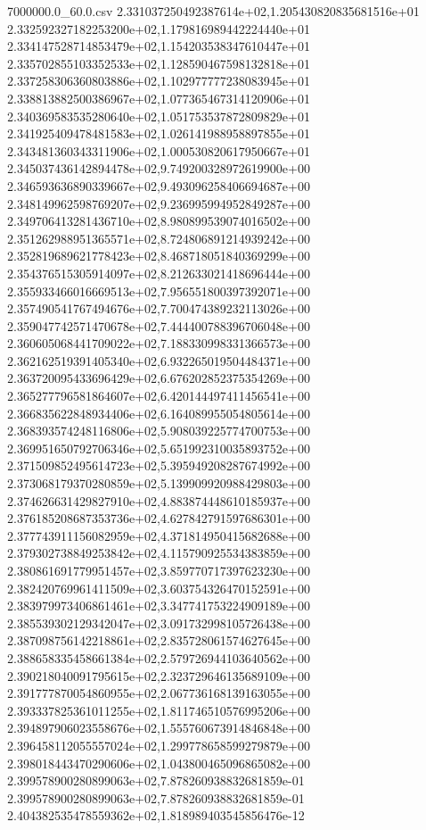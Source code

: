 \begin{filecontents*}{7000000.0_60.0.csv}
2.331037250492387614e+02,1.205430820835681516e+01
2.332592327182253200e+02,1.179816989442224440e+01
2.334147528714853479e+02,1.154203538347610447e+01
2.335702855103352533e+02,1.128590467598132818e+01
2.337258306360803886e+02,1.102977777238083945e+01
2.338813882500386967e+02,1.077365467314120906e+01
2.340369583535280640e+02,1.051753537872809829e+01
2.341925409478481583e+02,1.026141988958897855e+01
2.343481360343311906e+02,1.000530820617950667e+01
2.345037436142894478e+02,9.749200328972619900e+00
2.346593636890339667e+02,9.493096258406694687e+00
2.348149962598769207e+02,9.236995994952849287e+00
2.349706413281436710e+02,8.980899539074016502e+00
2.351262988951365571e+02,8.724806891214939242e+00
2.352819689621778423e+02,8.468718051840369299e+00
2.354376515305914097e+02,8.212633021418696444e+00
2.355933466016669513e+02,7.956551800397392071e+00
2.357490541767494676e+02,7.700474389232113026e+00
2.359047742571470678e+02,7.444400788396706048e+00
2.360605068441709022e+02,7.188330998331366573e+00
2.362162519391405340e+02,6.932265019504484371e+00
2.363720095433696429e+02,6.676202852375354269e+00
2.365277796581864607e+02,6.420144497411456541e+00
2.366835622848934406e+02,6.164089955054805614e+00
2.368393574248116806e+02,5.908039225774700753e+00
2.369951650792706346e+02,5.651992310035893752e+00
2.371509852495614723e+02,5.395949208287674992e+00
2.373068179370280859e+02,5.139909920988429803e+00
2.374626631429827910e+02,4.883874448610185937e+00
2.376185208687353736e+02,4.627842791597686301e+00
2.377743911156082959e+02,4.371814950415682688e+00
2.379302738849253842e+02,4.115790925534383859e+00
2.380861691779951457e+02,3.859770717397623230e+00
2.382420769961411509e+02,3.603754326470152591e+00
2.383979973406861461e+02,3.347741753224909189e+00
2.385539302129342047e+02,3.091732998105726438e+00
2.387098756142218861e+02,2.835728061574627645e+00
2.388658335458661384e+02,2.579726944103640562e+00
2.390218040091795615e+02,2.323729646135689109e+00
2.391777870054860955e+02,2.067736168139163055e+00
2.393337825361011255e+02,1.811746510576995206e+00
2.394897906023558676e+02,1.555760673914846848e+00
2.396458112055557024e+02,1.299778658599279879e+00
2.398018443470290606e+02,1.043800465096865082e+00
2.399578900280899063e+02,7.878260938832681859e-01
2.399578900280899063e+02,7.878260938832681859e-01
2.404382535478559362e+02,1.818989403545856476e-12
\end{filecontents*}

